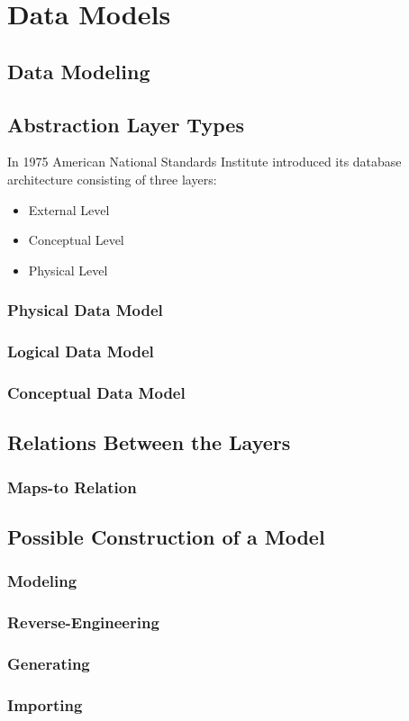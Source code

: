 \chapter{Data Models}

\section{Data Modeling}

\section{Abstraction Layer Types}


In 1975 American National Standards Institute \cite{ANSIArchitecture75} introduced its database architecture consisting of three layers:
\begin{itemize}
	\item  External Level
	\item Conceptual Level
	\item Physical Level
\end{itemize}

\subsection{Physical Data Model}

\subsection{Logical Data Model}

\subsection{Conceptual Data Model}

\section{Relations Between the Layers}

\subsection{Maps-to Relation}

\section{Possible Construction of a Model}

\subsection{Modeling}

\subsection{Reverse-Engineering}

\subsection{Generating}

\subsection{Importing}
